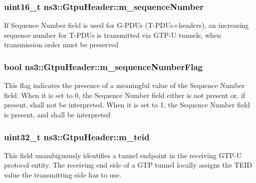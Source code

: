 \subsubsection[{\texorpdfstring{m\+\_\+sequence\+Number}{m_sequenceNumber}}]{\setlength{\rightskip}{0pt plus 5cm}uint16\+\_\+t ns3\+::\+Gtpu\+Header\+::m\+\_\+sequence\+Number\hspace{0.3cm}{\ttfamily [private]}}\hypertarget{classns3_1_1GtpuHeader_a819665f22b6dfc6492799edf4984db53}{}\label{classns3_1_1GtpuHeader_a819665f22b6dfc6492799edf4984db53}
If Sequence Number field is used for G-\/\+P\+D\+Us (T-\/\+P\+D\+Us+headers), an increasing sequence number for T-\/\+P\+D\+Us is transmitted via G\+T\+P-\/U tunnels, when transmission order must be preserved 
\subsubsection[{\texorpdfstring{m\+\_\+sequence\+Number\+Flag}{m_sequenceNumberFlag}}]{\setlength{\rightskip}{0pt plus 5cm}bool ns3\+::\+Gtpu\+Header\+::m\+\_\+sequence\+Number\+Flag\hspace{0.3cm}{\ttfamily [private]}}\hypertarget{classns3_1_1GtpuHeader_ae659c2713a5a90d90312a329827f1f07}{}\label{classns3_1_1GtpuHeader_ae659c2713a5a90d90312a329827f1f07}
This flag indicates the presence of a meaningful value of the Sequence Number field. When it is set to \textquotesingle{}0\textquotesingle{}, the Sequence Number field either is not present or, if present, shall not be interpreted. When it is set to \textquotesingle{}1\textquotesingle{}, the Sequence Number field is present, and shall be interpreted 
\subsubsection[{\texorpdfstring{m\+\_\+teid}{m_teid}}]{\setlength{\rightskip}{0pt plus 5cm}uint32\+\_\+t ns3\+::\+Gtpu\+Header\+::m\+\_\+teid\hspace{0.3cm}{\ttfamily [private]}}\hypertarget{classns3_1_1GtpuHeader_a2245b21ba4c0c28116fa3099b9cb1f44}{}\label{classns3_1_1GtpuHeader_a2245b21ba4c0c28116fa3099b9cb1f44}
This field unambiguously identifies a tunnel endpoint in the receiving G\+T\+P-\/U protocol entity. The receiving end side of a G\+TP tunnel locally assigns the T\+E\+ID value the transmitting side has to use. 
